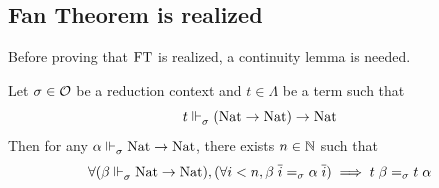 \documentclass[a4paper,UKenglish,cleveref, autoref, thm-restate]{lipics-v2021}
\begin{document}
\subsection{Fan Theorem is realized}

Before proving that $\mathrm{FT}$ is realized, a continuity lemma is needed.

\begin{lemma}[Continuity]\label{lem:continuity}
  Let $\sigma\in\mathcal O$ be a reduction context and $t \in \Lambda$ be a term such that
  \[t \Vdash_{\sigma}^{} (\mathrm{Nat} \to \mathrm{Nat}) \to \mathrm{Nat}\]
  Then for any $\alpha \Vdash_{\sigma}^{} \mathrm{Nat} \to \mathrm{Nat}$, there exists $n\in \mathbb N$ such that
  \[\forall (\beta \Vdash_{\sigma}^{} \mathrm{Nat} \to \mathrm{Nat}), (\forall i < n, \beta\;\overline i =_{\sigma} \alpha\;\overline i) \implies t\;\beta =_{\sigma} t\;\alpha\]
\end{lemma}
\end{document}
